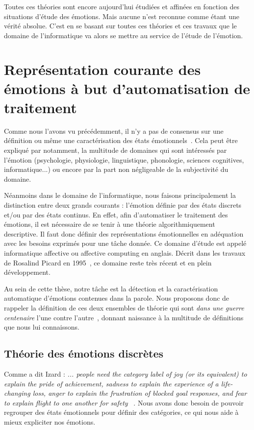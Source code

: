 Toutes ces théories sont encore aujourd'hui étudiées et affinées en fonction des situations d'étude des émotions. Mais aucune n'est reconnue comme étant une vérité absolue. C'est en se basant sur toutes ces théories et ces travaux que le domaine de l'informatique va alors se mettre au service de l'étude de l'émotion.


\section{Représentation courante des émotions à but d'automatisation de traitement}
Comme nous l'avons vu précédemment, il n'y a pas de consensus sur une définition ou même une caractérisation des états émotionnels~\cite{Kleinginna1981}. Cela peut être expliqué par notamment, la multitude de domaines qui sont intéressés par l'émotion (psychologie, physiologie, linguistique, phonologie, sciences cognitives, informatique...) ou encore par la part non négligeable de la subjectivité du domaine.

Néanmoins dans le domaine de l'informatique, nous faisons principalement la distinction entre deux grands courants : l'émotion définie par des états discrets et/ou par des états continus. En effet, afin d'automatiser le traitement des émotions, il est nécessaire de se tenir à une théorie algorithmiquement descriptive. Il faut donc définir des représentations émotionnelles en adéquation avec les besoins exprimés pour une tâche donnée. Ce domaine d'étude est appelé informatique affective ou affective computing en anglais. Décrit dans les travaux de Rosalind Picard en 1995~\cite{Picard2000}, ce domaine reste très récent et en plein développement.

Au sein de cette thèse, notre tâche est la détection et la caractérisation automatique d'émotions contenues dans la parole. Nous proposons donc de rappeler la définition de ces deux ensembles de théorie qui sont \textit{dans une guerre centenaire} l'une contre l'autre~\cite{Lindquist2013}, donnant naissance à la multitude de définitions que nous lui connaissons.

\subsection{Théorie des émotions discrètes}
Comme a dit Izard : \textit{... people need the category label of joy (or its equivalent) to explain the pride of achievement, sadness to explain the experience of a life- changing loss, anger to explain the frustration of blocked goal responses, and fear to explain flight to one another for safety}
~\cite{Izard2007}. Nous avons donc besoin de pouvoir regrouper des états émotionnels pour définir des catégories, ce qui nous aide à mieux expliciter nos émotions.


